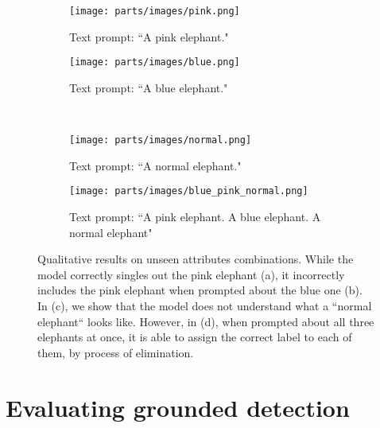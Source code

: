 \begin{figure*}[t!]
    \centering

    \begin{subfigure}[t]{0.45\textwidth}
        \centering
        \texttt{[image: parts/images/pink.png]}
        \label{ele1}
        \caption{Text prompt: ``A pink elephant."}
    \end{subfigure}
    \begin{subfigure}[t]{0.45\textwidth}
        \centering
        \texttt{[image: parts/images/blue.png]}
        \caption{Text prompt: ``A blue elephant."}
    \end{subfigure}
    \\
     \begin{subfigure}[t]{0.45\textwidth}
         \centering
        \texttt{[image: parts/images/normal.png]}
         \caption{Text prompt: ``A normal elephant."}
     \end{subfigure}
    \begin{subfigure}[t]{0.45\textwidth}
        \centering
        \texttt{[image: parts/images/blue\_pink\_normal.png]}
        \caption{Text prompt: ``A pink elephant. A blue elephant. A normal elephant"}
    \end{subfigure}\caption{Qualitative results on unseen attributes combinations. While the model correctly singles out the pink elephant (a), it incorrectly includes the pink elephant when prompted about the blue one (b). In (c), we show that the model does not understand what a ``normal elephant`` looks like. However, in (d), when prompted about all three elephants at once, it is able to assign the correct label to each of them, by process of elimination.}
\end{figure*}






\section{Evaluating grounded detection}
\label{sec:eval_GD}

